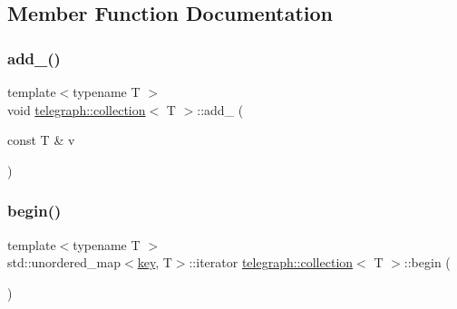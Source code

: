 \subsection{Member Function Documentation}
\mbox{\label{classtelegraph_1_1collection_af8383989a761fdd14631dd6c0e574298}} 
\subsubsection{\texorpdfstring{add\+\_\+()}{add\_()}}
{\footnotesize\ttfamily template$<$typename T $>$ \\
void \hyperlink{classtelegraph_1_1collection}{telegraph\+::collection}$<$ T $>$\+::add\+\_\+ (\begin{DoxyParamCaption}\item[{const T \&}]{v }\end{DoxyParamCaption})\hspace{0.3cm}{\ttfamily [inline]}}

\mbox{\label{classtelegraph_1_1collection_a0bebe64fbda6ce9af9922531879099c3}} 
\subsubsection{\texorpdfstring{begin()}{begin()}\hspace{0.1cm}{\footnotesize\ttfamily [1/2]}}
{\footnotesize\ttfamily template$<$typename T $>$ \\
std\+::unordered\+\_\+map$<$\hyperlink{classtelegraph_1_1collection_a7d1c05b1bdcbe95a3127122969e14173}{key}, T$>$\+::iterator \hyperlink{classtelegraph_1_1collection}{telegraph\+::collection}$<$ T $>$\+::begin (\begin{DoxyParamCaption}{ }\end{DoxyParamCaption})\hspace{0.3cm}{\ttfamily [inline]}}

\mbox{\label{classtelegraph_1_1collection_a262da7d56b726b69ddee3de30f086066}} 
